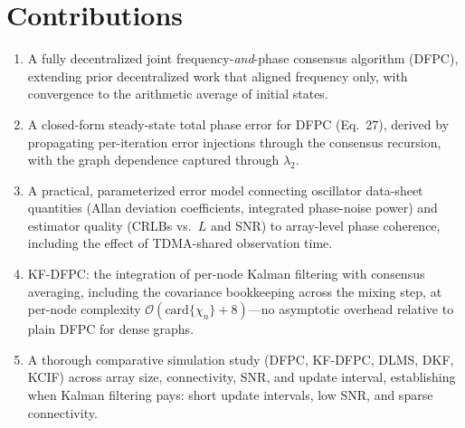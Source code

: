\documentclass[10pt]{article}
\begin{document}
\section{Contributions}
\begin{enumerate}
\item A fully decentralized joint frequency-\emph{and}-phase consensus
algorithm (DFPC), extending prior decentralized work that aligned frequency
only, with convergence to the arithmetic average of initial states.
\item A closed-form steady-state total phase error for DFPC (Eq.~27),
derived by propagating per-iteration error injections through the consensus
recursion, with the graph dependence captured through $\lambda_2$.
\item A practical, parameterized error model connecting oscillator
data-sheet quantities (Allan deviation coefficients, integrated phase-noise
power) and estimator quality (CRLBs vs.\ $L$ and SNR) to array-level phase
coherence, including the effect of TDMA-shared observation time.
\item KF-DFPC: the integration of per-node Kalman filtering with consensus
averaging, including the covariance bookkeeping across the mixing step, at
per-node complexity $\mathcal{O}(\mathrm{card}\{\chi_n\}+8)$---no asymptotic
overhead relative to plain DFPC for dense graphs.
\item A thorough comparative simulation study (DFPC, KF-DFPC, DLMS, DKF,
KCIF) across array size, connectivity, SNR, and update interval,
establishing when Kalman filtering pays: short update intervals, low SNR,
and sparse connectivity.
\end{enumerate}
\end{document}
